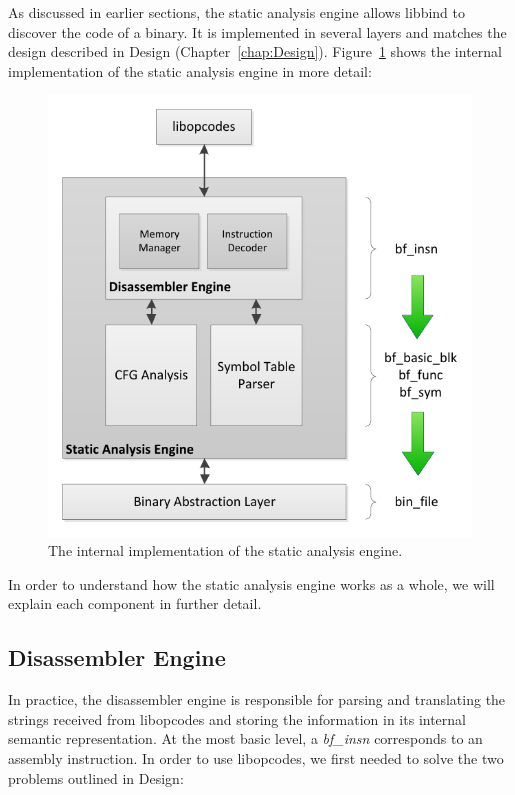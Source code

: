 As discussed in earlier sections, the static analysis engine allows libbind to discover the code of a binary. It is implemented in several layers and matches the design described in Design (Chapter~\ref{chap:Design}). Figure~\ref{fig:SAE_Detail} shows the internal implementation of the static analysis engine in more detail:

\begin{figure}[H]
 \centering
 \includegraphics{Static_Analysis_Engine_Detail.pdf}
 \caption[Hierarchy]{The internal implementation of the static analysis engine.}
\label{fig:SAE_Detail}
\end{figure}

In order to understand how the static analysis engine works as a whole, we will explain each component in further detail.

\subsection{Disassembler Engine}

In practice, the disassembler engine is responsible for parsing and translating the strings received from libopcodes and storing the information in its internal semantic representation. At the most basic level, a \emph{bf\_insn} corresponds to an assembly instruction. In order to use libopcodes, we first needed to solve the two problems outlined in Design:

